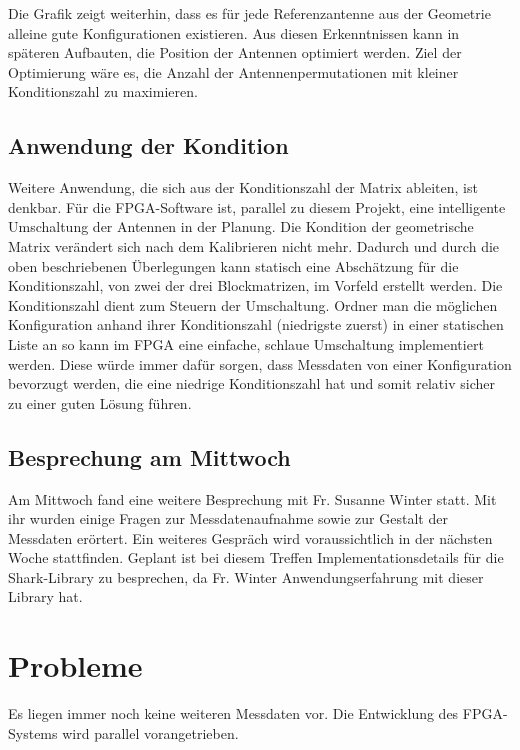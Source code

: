 \documentclass[a4paper,12pt,fleqn]{article}
\begin{document}
%
Die Grafik zeigt weiterhin, dass es für jede Referenzantenne aus der Geometrie alleine gute Konfigurationen existieren. Aus diesen Erkenntnissen kann in späteren Aufbauten, die Position der Antennen optimiert werden. Ziel der Optimierung wäre es, die Anzahl der Antennenpermutationen mit kleiner Konditionszahl zu maximieren.
%
\subsection{Anwendung der Kondition}
Weitere Anwendung, die sich aus der Konditionszahl der Matrix ableiten, ist denkbar. Für die FPGA-Software ist, parallel zu diesem Projekt, eine intelligente Umschaltung der Antennen in der Planung. Die Kondition der geometrische Matrix verändert sich nach dem Kalibrieren nicht mehr. Dadurch und durch die oben beschriebenen Überlegungen kann statisch eine Abschätzung für die Konditionszahl, von zwei der drei Blockmatrizen, im Vorfeld erstellt werden. Die Konditionszahl dient zum Steuern der Umschaltung. Ordner man die möglichen Konfiguration anhand ihrer Konditionszahl (niedrigste zuerst) in einer statischen Liste an so kann im FPGA eine einfache, schlaue Umschaltung implementiert werden. Diese würde immer dafür sorgen, dass Messdaten von einer Konfiguration bevorzugt werden, die eine niedrige Konditionszahl hat und somit relativ sicher zu einer guten Lösung führen.
%
\subsection{Besprechung am Mittwoch}
Am Mittwoch fand eine weitere Besprechung mit Fr. Susanne Winter statt. Mit ihr wurden einige Fragen zur Messdatenaufnahme sowie zur Gestalt der Messdaten erörtert. Ein weiteres Gespräch wird voraussichtlich in der nächsten Woche stattfinden. Geplant ist bei diesem Treffen Implementationsdetails für die Shark-Library zu besprechen, da Fr. Winter Anwendungserfahrung mit dieser Library hat.
%
\section{Probleme}
\label{Problems}
Es liegen immer noch keine weiteren Messdaten vor. Die Entwicklung des FPGA-Systems wird parallel vorangetrieben.
%


\newpage


\end{document}
